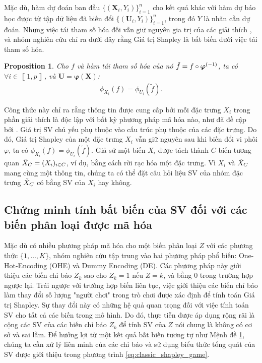 \documentclass[12pt, a4paper]{article}
\theoremstyle{plain}
\theoremstyle{proposition}
\newtheorem{proposition}{Proposition}[section]
\theoremstyle{lemma}
\newcommand\X{\boldsymbol{X}}
\begin{document}
Mặc dù, hàm dự đoán ban đầu $\{(\X_i, Y_i)\}_{i=1}^{n}$ cho kết quả khác với  hàm dự báo học được từ tập dữ liệu đã biến đổi $\{(\boldsymbol{U}_i,Y_i)\}_{i=1}^n$, trong đó $Y$ là nhãn cần dự đoán. Nhưng việc tái tham số hóa đối vẫn giữ nguyên gia trị của các giải thích , và nhóm nghiên cứu chỉ ra dưới đây rằng Giá trị Shapley là bất biến dưới việc tái tham số hóa.
\begin{proposition}\label{prop:reparam}
Cho $f$ và hàm tái tham số hóa của nó $\Tilde{f} = f \circ \boldsymbol{\varphi}^{(-1)}$, ta có $\forall i \in \left\llbracket 1,p\right\rrbracket$, và $\boldsymbol{U} = \boldsymbol{\varphi}(\X)$: 
\begin{align}
     \phi_{X_i}(f) = \phi_{U_i}(\tilde{f}). \label{eq:equivariance} 
\end{align}
\end{proposition}
Công thức này chỉ ra rằng thông tin được cung cấp bởi mỗi đặc trưng $X_i$ trong phần giải thích là độc lập với bất kỳ phương pháp mã hóa nào, như đã đề cập bởi \cite{covert2020explaining}. Giá trị SV chủ yếu phụ thuộc vào cấu trúc phụ thuộc của các đặc trưng. Do đó, Giá trị Shapley của một đặc trưng $X_i$ vẫn giữ nguyên sau khi biến đổi vi phôi $\varphi$, ta có $\phi_{X_i}(f) = \phi_{U_i}(\tilde{f})$. Giả sử một biến $X_i$ được tách thành $C$ biến tương quan $\Tilde{X}_C = (X_i)_{i \in C}$, ví dụ, bằng cách rời rạc hóa một đặc trưng. Vì $X_i$ và $\Tilde{X}_C$ mang cùng một thông tin, chúng ta có thể đặt câu hỏi liệu SV của nhóm đặc trưng $\Tilde{X}_C$ có bằng SV của $X_i$ hay không.

\subsection{Chứng minh tính bất biến của SV đối với các biến phân loại được mã hóa}

Mặc dù có nhiều phương pháp mã hóa cho một biến phân loại $Z$ với các phương thức $\{1,\dots,K\}$, nhóm nghiên cứu tập trung vào hai phương pháp phổ biến: One-Hot-Encoding (OHE) và Dummy Encoding (DE). Các phương pháp này giới thiệu các biến chỉ báo $Z_k$ sao cho $Z_{k}=1$ nếu $Z=k$, và bằng $0$ trong trường hợp ngược lại.
Trái ngược với trường hợp biến liên tục, việc giới thiệu các biến chỉ báo làm thay đổi số lượng "người chơi" trong trò chơi được xác định để tính toán Giá trị Shapley. Sự thay đổi này có những hệ quả quan trọng đối với việc tính toán SV cho tất cả các biến trong mô hình. Do đó, thực tiễn được áp dụng rộng rãi là cộng các SV của các biến chỉ báo $Z_k$ để tính SV của $Z$ nói chung là không có cơ sở và sai lầm. Để hưởng lợi từ một kết quả bất biến tương tự như Mệnh đề \ref{prop:reparam}, chúng ta cần xử lý liên minh của các chỉ báo và sử dụng biểu thức tổng quát của SV được giới thiệu trong phương trình \ref{eq:classic_shapley_game}.
\end{document}
